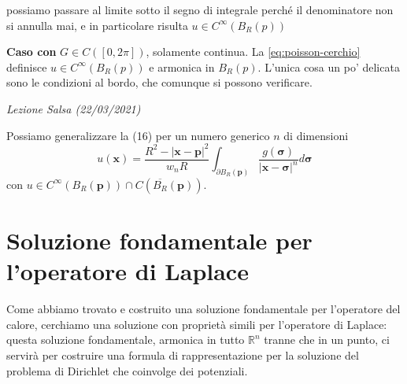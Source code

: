 \documentclass[10pt,a4paper,twoside,openright]{book}
\newcommand{\x}{\mathbf{x}}
\newcounter{conteggioS}
\newcommand{\LezioneS}[1]{
	\stepcounter{conteggioS}
	\textit{Lezione Salsa \arabic{conteggioS} (#1)}
	}
\begin{document}
\begin{dimostrazione}
\begin{figure}[H]

\end{figure}
\FloatBarrier

possiamo passare al limite sotto il segno di integrale perché il denominatore non si annulla mai, e in particolare risulta $u\in C^{\infty }(B_{R}(p))$

\textbf{Caso con }$G\in C([ 0,2\pi ])$, solamente continua. La \eqref{eq:poisson-cerchio} definisce $u\in C^{\infty }(B_{R}(p))$ e armonica in $B_{R}(p)$. L'unica cosa un po' delicata sono le condizioni al bordo, che comunque si possono verificare.

\end{dimostrazione}

\LezioneS{22/03/2021}

Possiamo generalizzare la (16) per un numero generico $\displaystyle n$ di dimensioni
\begin{equation*}
	u(\x) =\frac{R^{2} -| \x -\mathbf{p}| ^{2}}{w_{n} R}\int _{\partial B_{R}(\mathbf{p})}\frac{g(\bm{\sigma })}{| \x -\bm{\sigma }| ^{n}} d\bm{\sigma }
\end{equation*}
con $\displaystyle u\in C^{\infty }( B_{R}(\mathbf{p})) \cap C\left(\overline{B_{R}}(\mathbf{p})\right)$.
\section{Soluzione fondamentale per l'operatore di Laplace}

Come abbiamo trovato e costruito una soluzione fondamentale per l'operatore del calore, cerchiamo una soluzione con proprietà simili per l'operatore di Laplace: questa soluzione fondamentale, armonica in tutto $\displaystyle \mathbb{R}^{n}$ tranne che in un punto, ci servirà per costruire una formula di rappresentazione per la soluzione del problema di Dirichlet che coinvolge dei potenziali.
\end{document}
